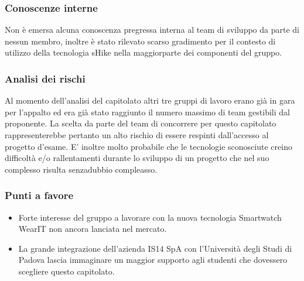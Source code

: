   \subsubsection{Conoscenze interne}
  Non è emersa alcuna conoscenza pregressa interna al team di sviluppo da parte di nessun membro, inoltre è stato rilevato scarso gradimento per il contesto di utilizzo della tecnologia sHike nella maggiorparte dei componenti del gruppo.
  \subsubsection{Analisi dei rischi}
  Al momento dell'analisi del capitolato altri tre gruppi di lavoro erano già in gara per l'appalto ed era già stato raggiunto il numero massimo di team gestibili dal proponente. La scelta da parte del team di concorrere per questo capitolato rappresenterebbe pertanto un alto rischio di essere respinti dall'accesso al progetto d'esame. E' inoltre molto probabile che le tecnologie sconosciute creino difficoltà e/o rallentamenti durante lo sviluppo di un progetto che nel suo complesso risulta senzadubbio compleasso.
  \subsubsection{Punti a favore}
  \begin{itemize}
     \item Forte interesse del gruppo a lavorare con la nuova tecnologia Smartwatch WearIT non ancora lanciata nel mercato.
     \item La grande integrazione dell'azienda IS14 SpA con l'Università degli Studi di Padova lascia immaginare un maggior supporto agli studenti che dovessero scegliere questo capitolato.
  \end{itemize}